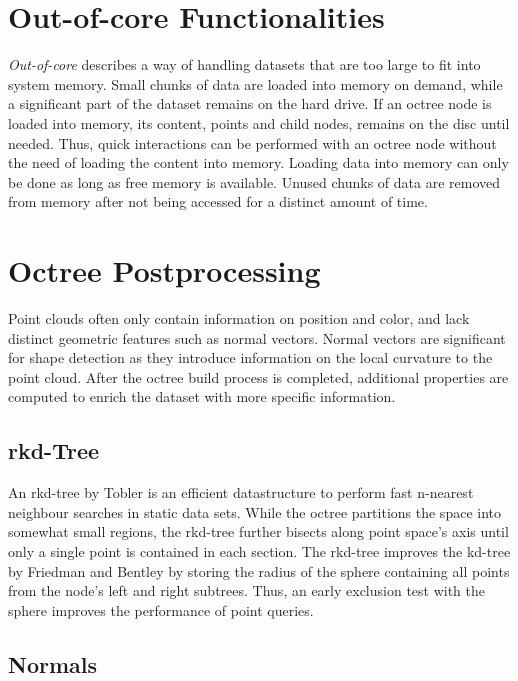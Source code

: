 \section{Out-of-core Functionalities}

\textit{Out-of-core} describes a way of handling datasets that are too large to fit into system memory. Small chunks of data are loaded into memory on demand, while a significant part of the dataset remains on the hard drive. If an octree node is loaded into memory, its content, points and child nodes, remains on the disc until needed. Thus, quick interactions can be performed with an octree node without the need of loading the content into memory. 
Loading data into memory can only be done as long as free memory is available. Unused chunks of data are removed from memory after not being accessed for a distinct amount of time.


\section{Octree Postprocessing}

Point clouds often only contain information on position and color, and lack distinct geometric features such as normal vectors. Normal vectors are significant for shape detection as they introduce information on the local curvature to the point cloud. After the octree build process is completed, additional properties are computed to enrich the dataset with more specific information. 


\subsection{rkd-Tree}

An rkd-tree by Tobler \cite{tobler2011rkd} is an efficient datastructure to perform fast n-nearest neighbour searches in static data sets. While the octree partitions the space into somewhat small regions, the rkd-tree further bisects along point space's axis until only a single point is contained in each section. The rkd-tree improves the kd-tree by Friedman and Bentley \cite{friedman1975algorithm} by storing the radius of the sphere containing all points from the node's left and right subtrees. Thus, an early exclusion test with the sphere improves the performance of point queries.  


\subsection{Normals}

